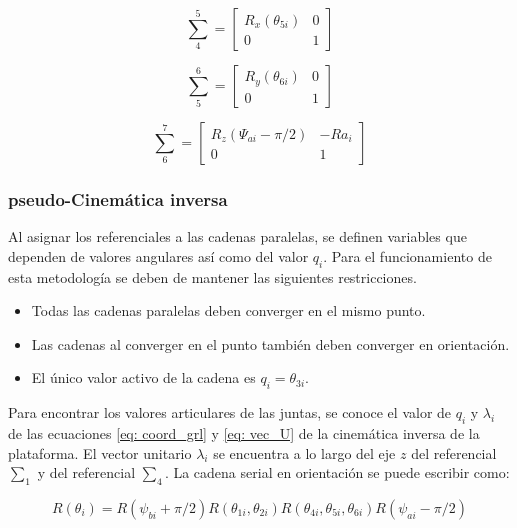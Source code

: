 \begin{equation}
\sum_4^5 = \begin{bmatrix}
R_x(\theta_{5i}) & 0\\
0 & 1
\end{bmatrix}
\end{equation}

\begin{equation}
\sum_5^6 = \begin{bmatrix}
R_y(\theta_{6i}) & 0\\
0 & 1
\end{bmatrix}
\end{equation}

\begin{equation}
\sum_6^7 = \begin{bmatrix}
R_z(\Psi_{ai} - \pi/2) & -Ra_i\\
0 & 1
\end{bmatrix}
\end{equation}

\subsubsection{pseudo-Cinemática inversa}
Al asignar los referenciales a las cadenas paralelas, se definen variables que dependen de 
valores angulares así como del valor $q_i$. Para el funcionamiento de esta metodología se 
deben de mantener las siguientes restricciones.

\begin{itemize}
  \item Todas las cadenas paralelas deben converger en el mismo punto.
  \item Las cadenas al converger en el punto también deben converger en orientación.
  \item El único valor activo de la cadena es $q_i = \theta_{3i}$.
\end{itemize}

Para encontrar los valores articulares de las juntas, se conoce el valor de $q_i$ y $\lambda_i$ de las ecuaciones \ref{eq: coord_grl} y \ref{eq: vec_U} de la cinemática inversa de la plataforma. El vector unitario $\lambda_i$ se encuentra a lo largo del eje $z$ del referencial $\sum_1$ y del referencial $\sum_4$. La cadena serial en orientación se puede escribir como:

\begin{equation} \label{eq: th_12-46}
R(\theta_i) = R(\psi_{bi}+\pi/2)R(\theta_{1i},\theta_{2i})R(\theta_{4i},\theta_{5i},\theta_{6i})R(\psi_{ai}-\pi/2)
\end{equation}

